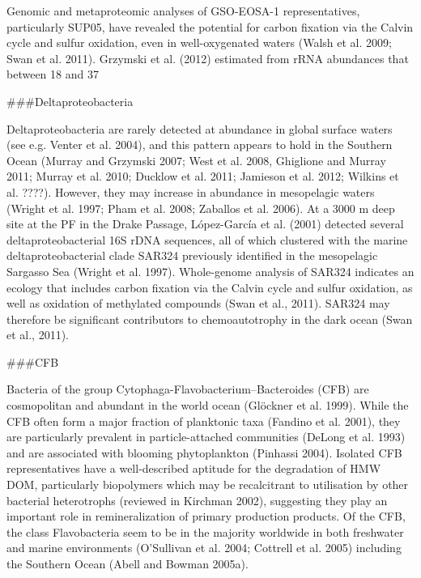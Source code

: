 Genomic and metaproteomic analyses of GSO-EOSA-1 representatives, particularly SUP05, have revealed the potential for carbon fixation via the Calvin cycle and sulfur oxidation, even in well-oxygenated waters (Walsh et al. 2009; Swan et al. 2011). Grzymski et al. (2012) estimated from rRNA abundances that between 18 and 37%

###Deltaproteobacteria

Deltaproteobacteria are rarely detected at abundance in global surface waters (see e.g. Venter et al. 2004), and this pattern appears to hold in the Southern Ocean (Murray and Grzymski 2007; West et al. 2008, Ghiglione and Murray 2011; Murray et al. 2010; Ducklow et al. 2011; Jamieson et al. 2012; Wilkins et al. ????). However, they may increase in abundance in mesopelagic waters (Wright et al. 1997; Pham et al. 2008; Zaballos et al. 2006). At a 3000 m deep site at the PF in the Drake Passage, López-García et al. (2001) detected several deltaproteobacterial 16S rDNA sequences, all of which clustered with the marine deltaproteobacterial clade SAR324 previously identified in the mesopelagic Sargasso Sea (Wright et al. 1997). Whole-genome analysis of SAR324 indicates an ecology that includes carbon fixation via the Calvin cycle and sulfur oxidation, as well as oxidation of methylated compounds (Swan et al., 2011). SAR324 may therefore be significant contributors to chemoautotrophy in the dark ocean (Swan et al., 2011).

###CFB

Bacteria of the group Cytophaga-Flavobacterium–Bacteroides (CFB) are cosmopolitan and abundant in the world ocean (Glöckner et al. 1999). While the CFB often form a major fraction of planktonic taxa (Fandino et al. 2001), they are particularly prevalent in particle-attached communities (DeLong et al. 1993) and are associated with blooming phytoplankton (Pinhassi 2004). Isolated CFB representatives have a well-described aptitude for the degradation of HMW DOM, particularly biopolymers which may be recalcitrant to utilisation by other bacterial heterotrophs (reviewed in Kirchman 2002), suggesting they play an important role in remineralization of primary production products. Of the CFB, the class Flavobacteria seem to be in the majority worldwide in both freshwater and marine environments (O'Sullivan et al. 2004; Cottrell et al. 2005) including the Southern Ocean (Abell and Bowman 2005a).

